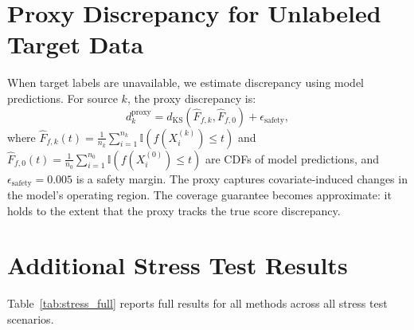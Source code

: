 \documentclass{article}
\newcommand{\Ind}{\mathbb{I}}
\newcommand{\dKS}{d_{\mathrm{KS}}}
\newcommand{\Fhat}{\widehat{F}}
\begin{document}
\section{Proxy Discrepancy for Unlabeled Target Data}
\label{app:proxy}

When target labels are unavailable, we estimate discrepancy using model predictions. For source $k$, the proxy discrepancy is:
\begin{equation}
d_k^{\text{proxy}} = \dKS\!\left(\Fhat_{f,k}, \Fhat_{f,0}\right) + \epsilon_{\text{safety}},
\end{equation}
where $\Fhat_{f,k}(t) = \frac{1}{n_k}\sum_{i=1}^{n_k} \Ind(f(X_i^{(k)}) \leq t)$ and $\Fhat_{f,0}(t) = \frac{1}{n_0}\sum_{i=1}^{n_0} \Ind(f(X_i^{(0)}) \leq t)$ are CDFs of model predictions, and $\epsilon_{\text{safety}} = 0.005$ is a safety margin. The proxy captures covariate-induced changes in the model's operating region. The coverage guarantee becomes approximate: it holds to the extent that the proxy tracks the true score discrepancy.

\section{Additional Stress Test Results}
\label{app:stress}

Table~\ref{tab:stress_full} reports full results for all methods across all stress test scenarios.
\end{document}
